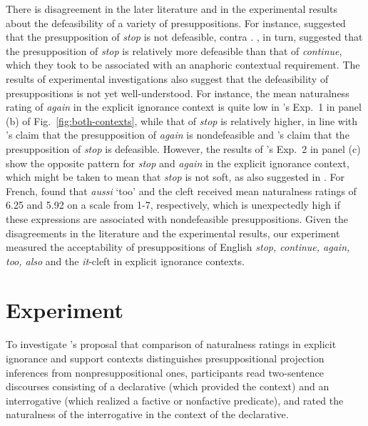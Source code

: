 \documentclass[11pt,fleqn]{article}
\newcommand{\6}{\mbox{$[\hspace*{-.6mm}[$}}
\newcommand{\9}{\mbox{$]\hspace*{-.6mm}]$}}
\newcommand{\citepos}[1]{\citeauthor{#1}'s \citeyear{#1}}
\begin{document}
There is disagreement in the later literature and in the experimental results about the defeasibility of a variety of presuppositions. For instance, \citealt[193]{abrusan2016} suggested that the presupposition of \emph{stop} is not defeasible, contra \citealt{simons01}. \citealt[734ff.]{roberts-simons2024}, in turn, suggested that the presupposition of \emph{stop} is relatively more defeasible than that of \emph{continue}, which they took to be associated with an anaphoric contextual requirement. The results of experimental investigations also suggest that the defeasibility of presuppositions is not yet well-understood. For instance, the mean naturalness rating of \emph{again} in the explicit ignorance context is quite low in \citepos{kalomoiros-schwarz2024} Exp.~1 in panel (b) of Fig.~\ref{fig:both-contexts}, while that of \emph{stop} is relatively higher, in line with \citepos{abusch10} claim that the presupposition of \emph{again} is nondefeasible and \citepos{simons01} claim that the presupposition of \emph{stop} is defeasible. However, the results of \citepos{kalomoiros-schwarz2024} Exp.~2 in panel (c) show the opposite pattern for \emph{stop} and \emph{again} in the explicit ignorance context, which might be taken to mean that \emph{stop} is not soft, as also suggested in \citealt[193]{abrusan2016}. For French, \citealt{jayez-etal2015} found that \emph{aussi} `too' and the cleft received mean naturalness ratings of 6.25 and 5.92 on a scale from 1-7, respectively, which is unexpectedly high if these expressions are associated with nondefeasible presuppositions. Given the disagreements in the literature and the experimental results, our experiment measured the acceptability of presuppositions of English \emph{stop, continue, again, too, also} and the {\em it}-cleft in explicit ignorance contexts.

\section{Experiment}\label{s2}

To investigate \citepos{mandelkern-etal2020} proposal that comparison of naturalness ratings in explicit ignorance and support contexts distinguishes presuppositional projection inferences from nonpresuppositional ones, participants read two-sentence discourses consisting of a declarative (which provided the context) and an interrogative (which realized a factive or nonfactive predicate), and rated the naturalness of the interrogative in the context of the declarative.
\end{document}
